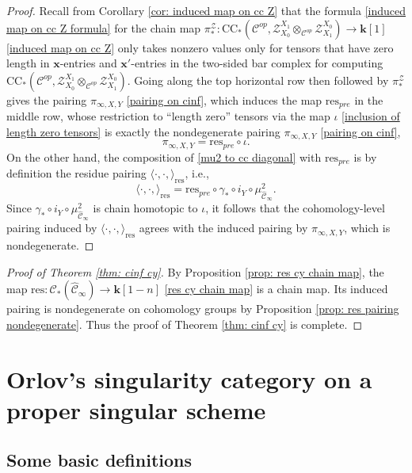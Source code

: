 \documentclass[11pt]{amsproc}
\def\K{{\mathbf{k}}}
\def\cZ{\mathcal{Z}}
\def\cc{\mathcal{C}}
\def\r#1{\mathrm{#1}}
\def\cinf{\widehat{\cc}_{\infty}}
\theoremstyle{remark}
\numberwithin{equation}{section}
\begin{document}
\begin{proof}
Recall from Corollary \eqref{cor: induced map on cc Z} that the formula \eqref{induced map on cc Z formula} for the chain map $\pi^{\cZ}_{*}: \r{CC}_{*}(\cc^{op}, \cZ_{X_{0}}^{X_{1}} \otimes_{\cc^{op}} \cZ_{X_{1}}^{X_{0}}) \to \K[1]$ \eqref{induced map on cc Z}
only takes nonzero values only for tensors that have zero length in $\mathbf{x}$-entries and $\mathbf{x}'$-entries in the two-sided bar complex for computing $\r{CC}_{*}(\cc^{op}, \cZ_{X_{0}}^{X_{1}} \otimes_{\cc^{op}} \cZ_{X_{1}}^{X_{0}})$.
Going along the top horizontal row then followed by $\pi^{\cZ}_{*}$ gives the pairing $\pi_{\infty, X, Y}$ \eqref{pairing on cinf},
which induces the map $\r{res}_{pre}$ in the middle row, 
whose restriction to ``length zero'' tensors via the map $\iota$ \eqref{inclusion of length zero tensors} is exactly the nondegenerate pairing $\pi_{\infty, X, Y}$ \eqref{pairing on cinf},
\begin{equation}
\pi_{\infty, X, Y} = \r{res}_{pre} \circ \iota.
\end{equation}
On the other hand, the composition of \eqref{mu2 to cc diagonal} with $\r{res}_{pre}$ is by definition the residue pairing $\langle \cdot, \cdot, \rangle_{\r{res}}$, i.e.,
\begin{equation}
\langle \cdot, \cdot, \rangle_{\r{res}} = \r{res}_{pre} \circ \gamma_{*} \circ i_{Y} \circ \mu_{\cinf}^{2}.
\end{equation}
Since $\gamma_{*} \circ i_{Y} \circ \mu_{\cinf}^{2}$ is chain homotopic to $\iota$,
it follows that the cohomology-level pairing induced by $\langle \cdot, \cdot, \rangle_{\r{res}}$ agrees with the induced pairing by $\pi_{\infty, X, Y}$, 
which is nondegenerate.
\end{proof}


\begin{proof}[Proof of Theorem \ref{thm: cinf cy}]
By Proposition \ref{prop: res cy chain map}, the map $\r{res}: \cc_{*}(\cinf) \to \K[1-n]$ \eqref{res cy chain map}  is a chain map.
Its induced pairing is nondegenerate on cohomology groups by Proposition \ref{prop: res pairing nondegenerate}.
Thus the proof of Theorem \ref{thm: cinf cy} is complete.
\end{proof}

\section{Orlov's singularity category on a proper singular scheme}\label{section: singularity category}

\subsection{Some basic definitions}
\end{document}
